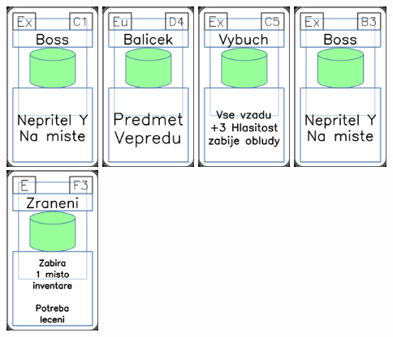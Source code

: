 \documentclass[a4paper]{article}
\begin{document}
	\includegraphics[width=3.0cm]{img-4_10}
	\includegraphics[width=3.0cm]{img-4_18}
	\includegraphics[width=3.0cm]{img-4_14}
	\includegraphics[width=3.0cm]{img-4_7}
	\includegraphics[width=3.0cm]{img-4_57}
\end{document}
